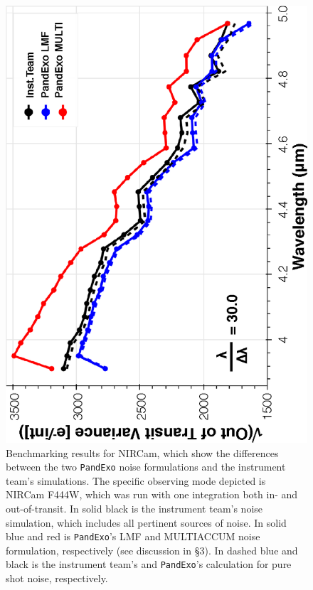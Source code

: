 \documentclass[iop]{emulateapj}
\begin{document}
\begin{figure}[ht]
 \includegraphics[angle=270,origin=c,width=\linewidth]{fig4.eps}
\caption{Benchmarking results for NIRCam, which show the differences between the two \texttt{PandExo} noise formulations and the instrument team's simulations. The specific observing mode depicted is NIRCam F444W, which was run with one integration both in- and out-of-transit. In solid black is the instrument team's noise simulation, which includes all pertinent sources of noise. In solid blue and red is \texttt{PandExo}'s LMF and MULTIACCUM noise formulation, respectively (see discussion in \S3). In dashed blue and black is the instrument team's and \texttt{PandExo}'s calculation for pure shot noise, respectively.\label{fig4}}
\end{figure}
\end{document}

